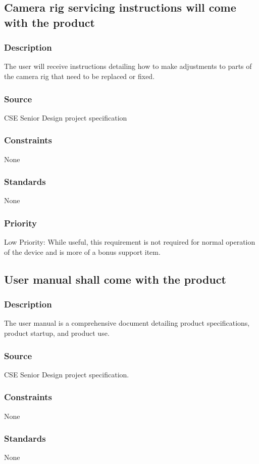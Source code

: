 \subsection{Camera rig servicing instructions will come with the product}
\subsubsection{Description}
The user will receive instructions detailing how to make adjustments to parts of the camera rig that need to be replaced or fixed.
\subsubsection{Source}
CSE Senior Design project specification
\subsubsection{Constraints}
None
\subsubsection{Standards}
None
\subsubsection{Priority}
Low Priority: While useful, this requirement is not required for normal operation of the device and is more of a bonus support item.

\subsection{User manual shall come with the product}
\subsubsection{Description}
The user manual is a comprehensive document detailing product specifications, product startup, and product use.
\subsubsection{Source}
CSE Senior Design project specification.
\subsubsection{Constraints}
None
\subsubsection{Standards}
None
